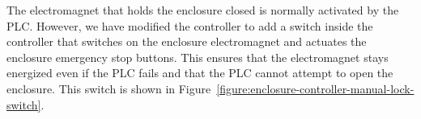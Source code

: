 
The electromagnet that holds the enclosure closed is normally activated by the PLC. However, we have modified the controller to add a switch inside the controller that switches on the enclosure electromagnet and actuates the enclosure emergency stop buttons. This ensures that the electromagnet stays energized even if the PLC fails and that the PLC cannot attempt to open the enclosure. This switch is shown in Figure~\ref{figure:enclosure-controller-manual-lock-switch}.

\begin{figure}
\begin{center}
\ifcoatlioan
{}
\fi
\ifddotioan
\resizebox{\columnwidth}{!}{%
}
\end{center}
\end{figure}
